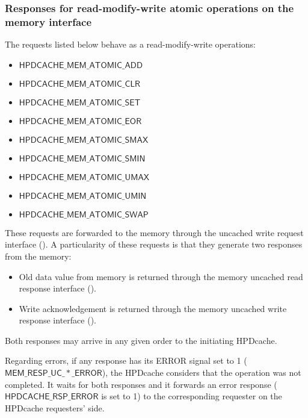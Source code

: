 \documentclass[10pt,titlepage,twoside]{book}
\begin{document}
\subsubsection{Responses for read-modify-write atomic operations on the memory interface}

\begin{minipage}{\textwidth}
The requests listed below behave as a read-modify-write operations:
{\small\begin{itemize}[itemsep=0pt]
  \item $\mathsf{HPDCACHE\_MEM\_ATOMIC\_ADD}$
  \item $\mathsf{HPDCACHE\_MEM\_ATOMIC\_CLR}$
  \item $\mathsf{HPDCACHE\_MEM\_ATOMIC\_SET}$
  \item $\mathsf{HPDCACHE\_MEM\_ATOMIC\_EOR}$
  \item $\mathsf{HPDCACHE\_MEM\_ATOMIC\_SMAX}$
  \item $\mathsf{HPDCACHE\_MEM\_ATOMIC\_SMIN}$
  \item $\mathsf{HPDCACHE\_MEM\_ATOMIC\_UMAX}$
  \item $\mathsf{HPDCACHE\_MEM\_ATOMIC\_UMIN}$
  \item $\mathsf{HPDCACHE\_MEM\_ATOMIC\_SWAP}$
\end{itemize}}
\end{minipage}

These requests are forwarded to the memory through the uncached write request interface ().
A particularity of these requests is that they generate two responses from the memory:
\begin{itemize}
  \item Old data value from memory is returned through the memory uncached read response interface ().
  \item Write acknowledgement is returned through the memory uncached write response interface ().
\end{itemize}

Both responses may arrive in any given order to the initiating \ac{HPDcache}.

Regarding errors, if any response has its ERROR signal set to 1 ($\mathsf{MEM\_RESP\_UC\_*\_ERROR}$), the \ac{HPDcache} considers that the operation was not completed.
It waits for both responses and it forwards an error response ($\mathsf{HPDCACHE\_RSP\_ERROR}$ is set to 1) to the corresponding requester on the \ac{HPDcache} requesters' side.
\end{document}

